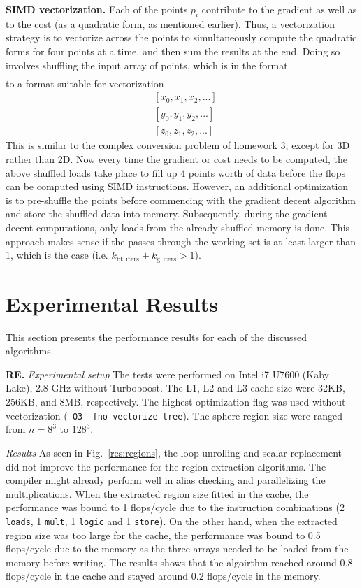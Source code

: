 \documentclass[letterpaper]{article}
\newcommand{\mypar}[1]{{\bf #1.}}
\begin{document}
\mypar{SIMD vectorization}
Each of the points $p_i$ contribute to the gradient as well as to the cost (as a quadratic form, as mentioned earlier). Thus, a vectorization strategy is to vectorize across the points to simultaneously compute the quadratic forms for four points at a time, and then sum the results at the end. Doing so involves shuffling the input array of points, which is in the format 
\begin{align}
  [x_0, y_0, z_0, x_1, y_1, z_1, x_2, y_2, ...]
\end{align}
to a format suitable for vectorization
\begin{align}
  &[x_0, x_1, x_2, ...] \\
  &[y_0, y_1, y_2, ...] \\
  &[z_0, z_1, z_2, ...]
\end{align}
This is similar to the complex conversion problem of homework 3, except for 3D rather than 2D. Now every time the gradient or cost needs to be computed, the above shuffled loads take place to fill up 4 points worth of data before the flops can be computed using SIMD instructions. However, an additional optimization is to pre-shuffle the points before commencing with the gradient decent algorithm and store the shuffled data into memory. Subsequently, during the gradient decent computations, only loads from the already shuffled memory is done. This approach makes sense if the passes through the working set is at least larger than 1, which is the case (i.e. $k_\mathrm{bt,iters}+k_\mathrm{g,iters} > 1$). 

\section{Experimental Results}\label{sec:exp}
This section presents the performance results for each of the discussed algorithms.

\mypar{RE} \textit{Experimental setup} The tests were performed on Intel i7 U7600 (Kaby Lake), 2.8 GHz without Turboboost. The L1, L2 and L3 cache size were 32KB, 256KB, and 8MB, respectively. The highest optimization flag was used without vectorization (\texttt{-O3 -fno-vectorize-tree}). The sphere region size were ranged from $n=8^{3}$ to $128^{3}$.

\textit{Results} As seen in Fig.~\ref{res:regions}, the loop unrolling and scalar replacement did not improve the performance for the region extraction algorithms. The compiler might already perform well in alias checking and parallelizing the multiplications. When the extracted region size fitted in the cache, the performance was bound to 1 flops/cycle due to the instruction combinations (2 {\tt loads}, 1 {\tt mult}, 1 {\tt logic} and 1 {\tt store}). On the other hand, when the extracted region size was too large for the cache, the performance was bound to 0.5 flops/cycle due to the memory as the three arrays needed to be loaded from the memory before writing. The results shows that the algoirthm reached around 0.8 flops/cycle in the cache and stayed around 0.2 flops/cycle in the memory.
   
\end{document}
